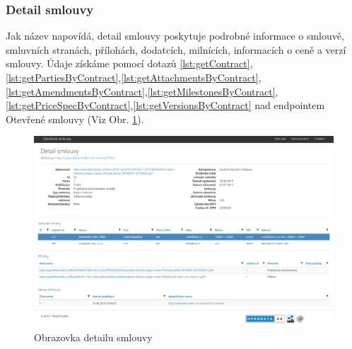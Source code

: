 






\subsubsection*{Detail smlouvy}

Jak název napovídá, detail smlouvy poskytuje podrobné informace o smlouvě, smluvních stranách, přílohách, dodatcích, milnících, informacích o ceně a verzí smlouvy. Údaje získáme pomocí dotazů \ref{lst:getContract},\ref{lst:getPartiesByContract},\ref{lst:getAttachmentsByContract},\ref{lst:getAmendmentsByContract},\ref{lst:getMilestonesByContract},\ref{lst:getPriceSpecByContract},\ref{lst:getVersionsByContract} nad endpointem Otevřené smlouvy (Viz Obr. \ref{obr:contractDetail}).\\

\begin{figure}[H]
\centerline{\includegraphics[width=\textwidth]{img/webContractDetail.eps}}
\caption{Obrazovka detailu smlouvy}
\label{obr:contractDetail}
\end{figure}





